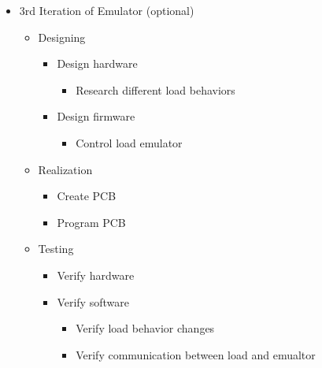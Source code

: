 \begin{itemize}
    \item 3rd Iteration of Emulator (optional)
    \begin{itemize}
        \item Designing 
        \begin{itemize}
            \item Design hardware
            \begin{itemize}
                \item Research different load behaviors
            \end{itemize}
            \item Design firmware
            \begin{itemize}
                \item Control load emulator
            \end{itemize}
        \end{itemize}
        \item Realization
        \begin{itemize}
        \item Create PCB
        \item Program PCB
        \end{itemize}
        \item Testing
        \begin{itemize}
            \item Verify hardware
            \item Verify software 
            \begin{itemize}
                \item Verify load behavior changes
                \item Verify communication between load and emualtor
            \end{itemize}
        \end{itemize}
    \end{itemize}




\end{itemize}

